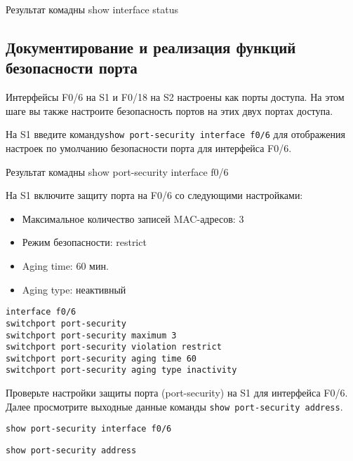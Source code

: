 \begin{image}
	\caption{Результат комадны show interface status}
\end{image}

\subsection{Документирование и реализация функций безопасности порта}

Интерфейсы F0/6 на S1 и F0/18 на S2 настроены как порты доступа.
На этом шаге вы также настроите безопасность портов
на этих двух портах доступа.

На S1 введите команду\texttt{show port-security interface f0/6} 
для отображения настроек по умолчанию безопасности порта для интерфейса F0/6.

\begin{image}
	\caption{Результат комадны show port-security interface f0/6}
\end{image}

На S1 включите защиту порта на F0/6 со следующими настройками:

\begin{itemize}
	\item Максимальное количество записей MAC-адресов: 3
	\item Режим безопасности: restrict
	\item Aging time: 60 мин.
	\item Aging type: неактивный
\end{itemize}

\begin{verbatim}
interface f0/6
switchport port-security
switchport port-security maximum 3
switchport port-security violation restrict
switchport port-security aging time 60
switchport port-security aging type inactivity
\end{verbatim}

Проверьте настройки защиты порта (port-security) на S1 для интерфейса F0/6.
Далее просмотрите выходные данные команды \texttt{show port-security address}.

\begin{verbatim}
show port-security interface f0/6
\end{verbatim}

\begin{verbatim}
show port-security address
\end{verbatim}

